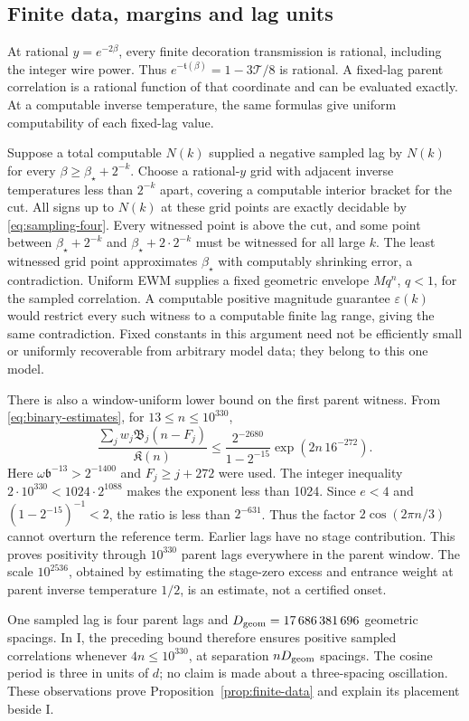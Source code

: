 \subsection{Finite data, margins and lag units}\label{sec:finite-data}

At rational \(y=e^{-2\beta}\), every finite decoration transmission is rational, including the integer wire power. Thus \(e^{-\mathfrak t(\beta)}=1-3\mathcal T/8\) is rational. A fixed-lag parent correlation is a rational function of that coordinate and can be evaluated exactly. At a computable inverse temperature, the same formulas give uniform computability of each fixed-lag value.

Suppose a total computable \(N(k)\) supplied a negative sampled lag by \(N(k)\) for every \(\beta\ge\beta_\star+2^{-k}\). Choose a rational-\(y\) grid with adjacent inverse temperatures less than \(2^{-k}\) apart, covering a computable interior bracket for the cut. All signs up to \(N(k)\) at these grid points are exactly decidable by \eqref{eq:sampling-four}. Every witnessed point is above the cut, and some point between \(\beta_\star+2^{-k}\) and \(\beta_\star+2\cdot2^{-k}\) must be witnessed for all large \(k\). The least witnessed grid point approximates \(\beta_\star\) with computably shrinking error, a contradiction. Uniform EWM supplies a fixed geometric envelope \(M q^n\), \(q<1\), for the sampled correlation. A computable positive magnitude guarantee \(\varepsilon(k)\) would restrict every such witness to a computable finite lag range, giving the same contradiction. Fixed constants in this argument need not be efficiently small or uniformly recoverable from arbitrary model data; they belong to this one model.

There is also a window-uniform lower bound on the first parent witness. From \eqref{eq:binary-estimates}, for \(13\le n\le10^{330}\),
\[
 \frac{\sum_jw_j\mathfrak B_j(n-F_j)}{\mathfrak K(n)}
 \le \frac{2^{-2680}}{1-2^{-15}}
       \exp(2n\,16^{-272}).
\]
Here \(\omega\mathfrak b^{-13}>2^{-1400}\) and \(F_j\ge j+272\) were used. The integer inequality \(2\cdot10^{330}<1024\cdot2^{1088}\) makes the exponent less than 1024. Since \(e<4\) and \((1-2^{-15})^{-1}<2\), the ratio is less than \(2^{-631}\). Thus the factor \(2\cos(2\pi n/3)\) cannot overturn the reference term. Earlier lags have no stage contribution. This proves positivity through \(10^{330}\) parent lags everywhere in the parent window. The scale \(10^{2536}\), obtained by estimating the stage-zero excess and entrance weight at parent inverse temperature \(1/2\), is an estimate, not a certified onset.

One sampled lag is four parent lags and \(D_{\rm geom}=17\,686\,381\,696\) geometric spacings. In I, the preceding bound therefore ensures positive sampled correlations whenever \(4n\le10^{330}\), at separation \(nD_{\rm geom}\) spacings. The cosine period is three in units of \(d\); no claim is made about a three-spacing oscillation. These observations prove Proposition~\ref{prop:finite-data} and explain its placement beside I.
